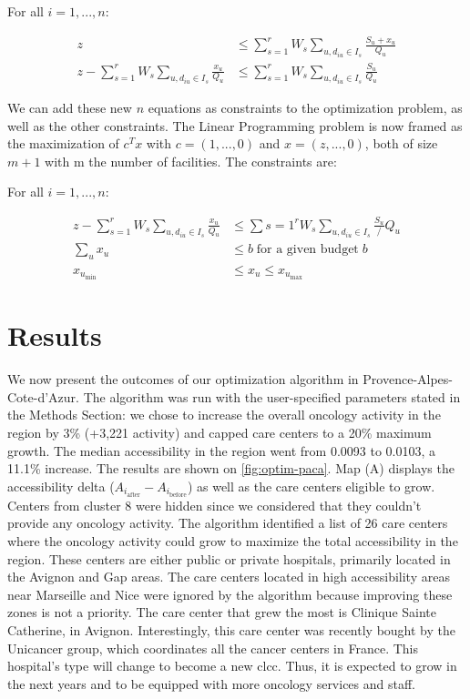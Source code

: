For all $i=1, ... ,n$:

\begin{align*}
    z                                                              & \leq \sum_{s=1}^{r} W_s \sum_{u, d_{iu} \in I_s} \frac{S_u + x_u}{Q_u} \\
    z - \sum_{s=1}^{r} W_s \sum_{u,d_{iu} \in I_s} \frac{x_u}{Q_u} & \leq \sum_{s=1}^{r} W_s \sum_{u,d_{iu} \in I_s} \frac{S_u}{Q_u}
\end{align*}

We can add these new $n$ equations as constraints to the optimization problem,
as well as the other constraints. The Linear Programming problem is now framed
as the maximization of $c^T x$ with $c=(1, ... ,0)$ and $x=(z, ... ,0)$, both of
size $m+1$ with m the number of facilities. The constraints are:

For all $i=1, ... ,n$:

\begin{align*}
    z - \sum_{s=1}^{r} W_s \sum_{u,d_{iu} \in I_s} \frac{x_u}{Q_u} & \leq \sum{s=1}^{r} W_s \sum_{u,d_{iu} \in I_s} \frac{S_u}/{Q_u} \\
    \sum_{u} x_u                                                   & \leq b \; \text{for a given budget} \; b                        \\
    x_{u_\text{min}}                                               & \leq x_u \leq x_{u_\text{max}}
\end{align*}

\section{Results}

We now present the outcomes of our optimization algorithm in
Provence-Alpes-Cote-d'Azur. The algorithm was run with the user-specified
parameters stated in the Methods Section: we chose to increase the overall
oncology activity in the region by 3\% (+3,221 activity) and capped care centers
to a 20\% maximum growth. The median accessibility in the region went from
0.0093 to 0.0103, a 11.1\% increase. The results are shown on
\cref{fig:optim-paca}. Map (A) displays the accessibility delta
($A_{i_\text{after}} - A_{i_\text{before}}$) as well as the care centers
eligible to grow. Centers from cluster 8 were hidden since we considered that
they couldn't provide any oncology activity. The algorithm identified a list of
26 care centers where the oncology activity could grow to maximize the total
accessibility in the region. These centers are either public or private
hospitals, primarily located in the Avignon and Gap areas. The care centers
located in high accessibility areas near Marseille and Nice were ignored by the
algorithm because improving these zones is not a priority. The care center that
grew the most is Clinique Sainte Catherine, in Avignon. Interestingly, this care
center was recently bought by the Unicancer group, which coordinates all the
cancer centers in France. This hospital's type will change to become a new
\ac{clcc}. Thus, it is expected to grow in the next years and to be equipped
with more oncology services and staff.

